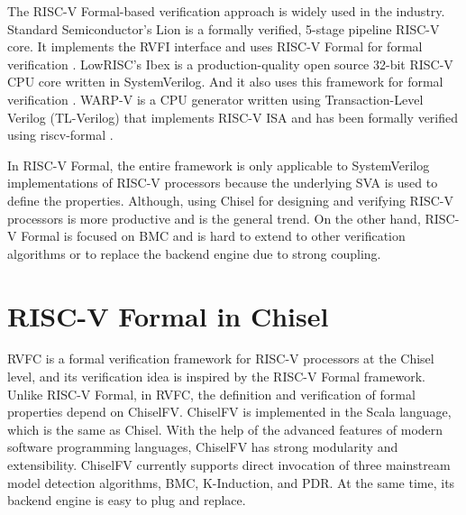 \documentclass[conference]{IEEEtran}
\theoremstyle{definition}
\begin{document}
The RISC-V Formal-based verification approach is widely used in the industry. 
Standard Semiconductor's Lion is a formally verified, 5-stage pipeline RISC-V core.
It implements the RVFI interface and uses RISC-V Formal for formal verification \cite{lion}.
LowRISC's Ibex is a production-quality open source 32-bit RISC-V CPU core written in SystemVerilog. And it also uses this framework for formal verification \cite{ibex}.
WARP-V is a CPU generator written using Transaction-Level Verilog (TL-Verilog) that implements RISC-V ISA and has been formally verified using riscv-formal \cite{hoover2018formally}.

In RISC-V Formal, the entire framework is only applicable to SystemVerilog implementations of RISC-V processors because the underlying SVA is used to define the properties.
Although, using Chisel for designing and verifying RISC-V processors is more productive and is the general trend.
On the other hand, RISC-V Formal is focused on BMC and is hard to extend to other verification algorithms or to replace the backend engine due to strong coupling.

\section{RISC-V Formal in Chisel}

RVFC is a formal verification framework for RISC-V processors at the Chisel level, and its verification idea is inspired by the RISC-V Formal framework.
Unlike RISC-V Formal, in RVFC, the definition and verification of formal properties depend on ChiselFV.
ChiselFV is implemented in the Scala language, which is the same as Chisel. With the help of the advanced features of modern software programming languages, ChiselFV has strong modularity and extensibility.
ChiselFV currently supports direct invocation of three mainstream model detection algorithms, BMC, K-Induction, and PDR. At the same time, its backend engine is easy to plug and replace.
\end{document}
